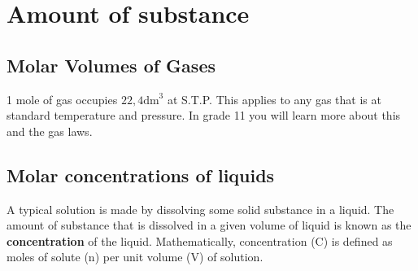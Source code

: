 \section{Amount of substance}
            \subsection*{Molar Volumes of Gases}
            \nopagebreak
            \par
            \label{m38712*eip-id1168064596799}
  { \label{m38712*eip-id1168053572222}1 mole of gas occupies $22,4{\mathrm{dm}}^{3}$ at S.T.P. } 
      \label{m38712*id282112}This applies to any gas that is at standard temperature and pressure. In grade 11 you will learn more about this and the gas laws.\par 
    \label{m38712*cid8}
            \subsection*{Molar concentrations of liquids}
            \nopagebreak
      \label{m38712*id282848}A typical solution is made by dissolving some solid substance in a liquid. The amount of substance that is dissolved in a given volume of liquid is known as the \textbf{concentration} of the liquid. Mathematically, concentration (C) is defined as moles of solute (n) per unit volume (V) of solution.\par 
      \label{m38712*id282860}\nopagebreak\noindent{}
        
